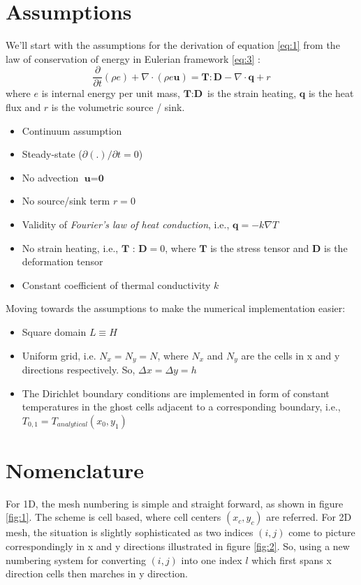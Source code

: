 \documentclass[12pt]{amsart}   %
\begin{document}
\section{Assumptions \label{sec:assumptions}}
We'll start with the assumptions for the derivation of equation \ref{eq:1} from the law of conservation of energy in Eulerian framework \ref{eq:3} \cite{oden2011introduction}:
    \begin{equation} \label{eq:3}
        \frac{ \partial }{ \partial t }{(\rho e) + \nabla \cdot(\rho e \textbf{u}) = \textbf{T}:\textbf{D} -\nabla \cdot \textbf{q} + r}
    \end{equation}
where $e$ is internal energy per unit mass, $\textbf{T}:\textbf{D}$ is the strain heating, $\textbf{q}$ is the heat flux and $r$ is the volumetric source / sink. 
\begin{itemize}
\item Continuum assumption
    \item Steady-state ($\partial(.) / \partial t = 0$)
    \item No advection $\textbf{u}=\textbf{0}$
    \item No source/sink term $r=0$
    \item Validity of \textit{Fourier's law of heat conduction}, i.e., $\textbf{q} =-k \nabla T$
    \item No strain heating, i.e., $\textbf{T : D}=0$, where $\textbf{T}$ is the stress tensor and $\textbf{D}$ is the deformation tensor
    \item Constant coefficient of thermal conductivity $k$
\end{itemize}

Moving towards the assumptions to make the numerical implementation easier:
\begin{itemize}
    \item Square domain $L\equiv H$
    \item Uniform grid, i.e. $N_x=N_y=N$, where $N_x$ and $N_y$ are the cells in x and y directions respectively. So, $\Delta x = \Delta y = h$
    \item The Dirichlet boundary conditions are implemented in form of constant temperatures in the ghost cells adjacent to a corresponding boundary, i.e., $T_{0,1}=T_{analytical}(x_0,y_1)$
\end{itemize}

\section{Nomenclature}
For 1D, the mesh numbering is simple and straight forward, as shown in figure \ref{fig:1}. The scheme is cell based, where cell centers $(x_c,y_c)$ are referred. For 2D mesh, the situation is slightly sophisticated as two indices $(i,j)$ come to picture correspondingly in x and y directions illustrated in figure \ref{fig:2}. So, using a new numbering system for converting $(i,j)$ into one index $l$ which first spans x direction cells then marches in y direction.
\end{document}
